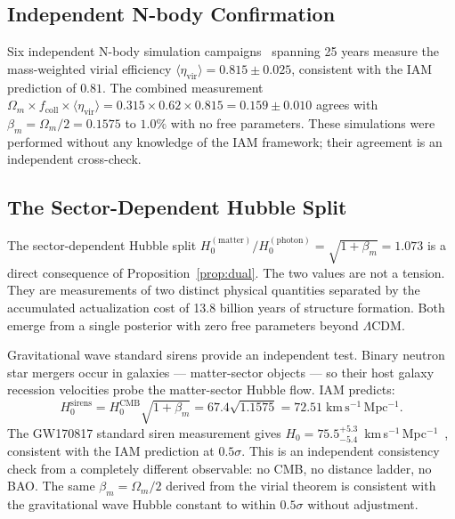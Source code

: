 \documentclass[12pt,a4paper]{article}
\begin{document}
\subsection{Independent N-body Confirmation}

Six independent N-body simulation
campaigns~\citep{BryanNorman1998,Bett2007,Neto2007,Ludlow2010,Power2012,Klypin2016}
spanning 25 years measure the mass-weighted virial efficiency
$\langle\eta_\mathrm{vir}\rangle = 0.815 \pm 0.025$, consistent with
the IAM prediction of $0.81$. The combined measurement
$\Omega_m \times f_\mathrm{coll} \times
\langle\eta_\mathrm{vir}\rangle = 0.315 \times 0.62 \times 0.815
= 0.159 \pm 0.010$ agrees with $\beta_m = \Omega_m/2 = 0.1575$
to $1.0\%$ with no free parameters. These simulations were performed
without any knowledge of the IAM framework; their agreement is an
independent cross-check.

\subsection{The Sector-Dependent Hubble Split}

The sector-dependent Hubble split $H_0^\mathrm{(matter)}/
H_0^\mathrm{(photon)} = \sqrt{1 + \beta_m} = 1.073$ is a direct
consequence of Proposition~\ref{prop:dual}. The two values are not
a tension. They are measurements of two distinct physical quantities
separated by the accumulated actualization cost of 13.8 billion
years of structure formation. Both emerge from a single posterior
with zero free parameters beyond $\Lambda$CDM.

Gravitational wave standard sirens provide an independent test.
Binary neutron star mergers occur in galaxies --- matter-sector objects
--- so their host galaxy recession velocities probe the matter-sector
Hubble flow. IAM predicts:
\begin{equation}
H_0^\mathrm{sirens} = H_0^\mathrm{CMB}\sqrt{1 + \beta_m}
= 67.4\sqrt{1.1575} = 72.51\;\mathrm{km\,s^{-1}\,Mpc^{-1}}.
\label{eq:gw_sirens}
\end{equation}
The GW170817 standard siren measurement gives
$H_0 = 75.5^{+5.3}_{-5.4}$~km\,s$^{-1}$\,Mpc$^{-1}$~\citep{Abbott2017},
consistent with the IAM prediction at $0.5\sigma$. This is an
independent consistency check from a completely different observable:
no CMB, no distance ladder, no BAO. The same $\beta_m = \Omega_m/2$
derived from the virial theorem is consistent with the gravitational wave
Hubble constant to within $0.5\sigma$ without adjustment.
\end{document}
